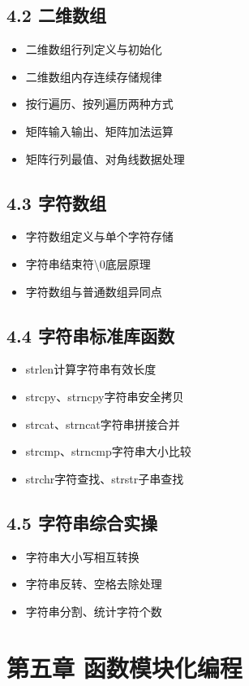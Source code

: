 \subsection*{4.2 二维数组}
\begin{itemize}
\item 二维数组行列定义与初始化
\item 二维数组内存连续存储规律
\item 按行遍历、按列遍历两种方式
\item 矩阵输入输出、矩阵加法运算
\item 矩阵行列最值、对角线数据处理
\end{itemize}

\subsection*{4.3 字符数组}
\begin{itemize}
\item 字符数组定义与单个字符存储
\item 字符串结束符\textbackslash0底层原理
\item 字符数组与普通数组异同点
\end{itemize}

\subsection*{4.4 字符串标准库函数}
\begin{itemize}
\item strlen计算字符串有效长度
\item strcpy、strncpy字符串安全拷贝
\item strcat、strncat字符串拼接合并
\item strcmp、strncmp字符串大小比较
\item strchr字符查找、strstr子串查找
\end{itemize}

\subsection*{4.5 字符串综合实操}
\begin{itemize}
\item 字符串大小写相互转换
\item 字符串反转、空格去除处理
\item 字符串分割、统计字符个数
\end{itemize}

\section*{第五章 函数模块化编程}
